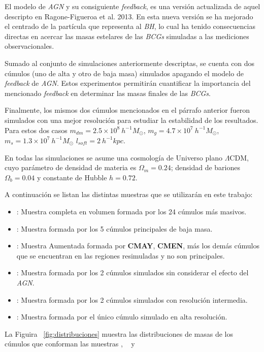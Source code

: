 El modelo de {\it AGN} y su consiguiente {\it feedback}, es una versi\'on actualizada de aquel descripto en Ragone-Figueroa 
et al. 2013. En esta nueva versi\'on se ha mejorado el centrado de la part\'icula que representa al {\it BH}, lo cual ha tenido 
consecuencias directas en acercar las masas estelares de las {\it BCGs} simuladas a las mediciones observacionales. 

Sumado al conjunto de simulaciones anteriormente descriptas, se cuenta con dos c\'umulos (uno de alta y otro de baja masa) simulados
apagando el modelo de {\it feedback} de {\it AGN}.
Estos experimentos permitir\'an cuantificar la importancia del mencionado
{\it feedback} en determinar las masas finales de las {\it BCGs}.

Finalmente, los mismos dos c\'umulos mencionados en el p\'arrafo anterior fueron simulados con una mejor resoluci\'on 
para estudiar la estabilidad de los resultados. Para estos dos
casos $m_{dm}=2.5\times10^8~h^{-1}M_{\odot}$, 
$m_{g}=4.7\times10^7~h^{-1}M_{\odot}$,
$m_{s}=1.3\times10^7~h^{-1}M_{\odot}$  $l_{soft}=2~h^{-1}kpc$. 

En todas las simulaciones se asume una cosmolog\'ia de Universo plano $\Lambda$CDM, cuyo par\'ametro de 
densidad de materia es $\Omega_m=0.24$; densidad de bariones $\Omega_b=0.04$ y constante de Hubble $h=0.72$.

\medskip
A continuaci\'on se listan las distintas muestras que se utilizar\'an en este trabajo:

\begin{itemize}

\item \cmay: Muestra completa en volumen formada por los 24 c\'umulos m\'as masivos. 
\item \cmen: Muestra formada por los 5 c\'umulos principales de baja masa. 
\item \aum: Muestra Aumentada formada por {\bf CMAY}, {\bf CMEN}, m\'as
los dem\'as c\'umulos que se encuentran en las regiones resimuladas y no son principales. 
\item \agnoff: Muestra formada por los 2 c\'umulos simulados sin considerar el efecto del {\it AGN}.
\item \mr: Muestra formada por los 2 c\'umulos simulados con resoluci\'on intermedia.
\item \hr: Muestra formada por el \'unico c\'umulo simulado en alta resoluci\'on.

\end{itemize}
La Figuira ~\ref{fig:distribuciones} muestra las distribuciones de masas 
de los c\'umulos que conforman las muestras \cmay, \cmen~ y \aum

